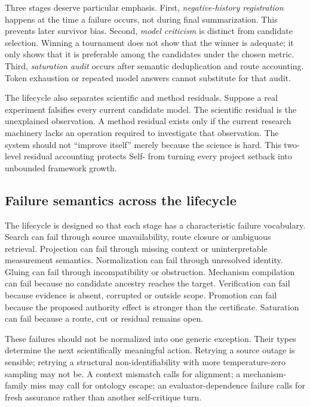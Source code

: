 Three stages deserve particular emphasis. First, \emph{negative-history registration} happens at the time a failure occurs, not during final summarization. This prevents later survivor bias. Second, \emph{model criticism} is distinct from candidate selection. Winning a tournament does not show that the winner is adequate; it only shows that it is preferable among the candidates under the chosen metric. Third, \emph{saturation audit} occurs after semantic deduplication and route accounting. Token exhaustion or repeated model answers cannot substitute for that audit.

The lifecycle also separates scientific and method residuals. Suppose a real experiment falsifies every current candidate model. The scientific residual is the unexplained observation. A method residual exists only if the current research machinery lacks an operation required to investigate that observation. The system should not ``improve itself'' merely because the science is hard. This two-level residual accounting protects Self-\RAKL{} from turning every project setback into unbounded framework growth.

\subsection{Failure semantics across the lifecycle}

The lifecycle is designed so that each stage has a characteristic failure vocabulary. Search can fail through source unavailability, route closure or ambiguous retrieval. Projection can fail through missing context or uninterpretable measurement semantics. Normalization can fail through unresolved identity. Gluing can fail through incompatibility or obstruction. Mechanism compilation can fail because no candidate ancestry reaches the target. Verification can fail because evidence is absent, corrupted or outside scope. Promotion can fail because the proposed authority effect is stronger than the certificate. Saturation can fail because a route, cut or residual remains open.

These failures should not be normalized into one generic exception. Their types determine the next scientifically meaningful action. Retrying a source outage is sensible; retrying a structural non-identifiability with more temperature-zero sampling may not be. A context mismatch calls for alignment; a mechanism-family miss may call for ontology escape; an evaluator-dependence failure calls for fresh assurance rather than another self-critique turn.

